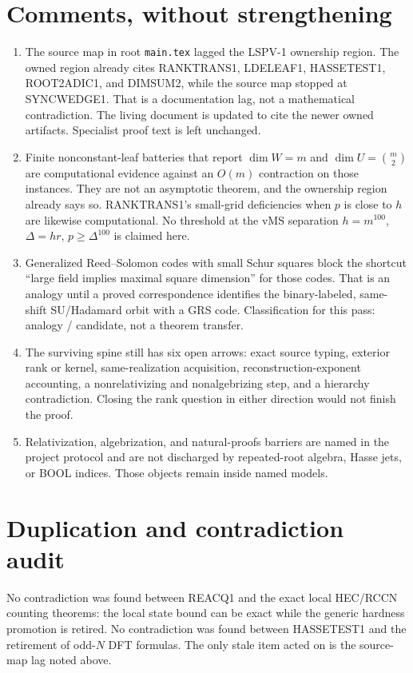 \documentclass[11pt]{article}
\begin{document}
\section*{Comments, without strengthening}
\begin{enumerate}
\item The source map in root \texttt{main.tex} lagged the LSPV-1 ownership region.
The owned region already cites RANKTRANS1, LDELEAF1, HASSETEST1, ROOT2ADIC1, and
DIMSUM2, while the source map stopped at SYNCWEDGE1. That is a documentation lag,
not a mathematical contradiction. The living document is updated to cite the newer
owned artifacts. Specialist proof text is left unchanged.
\item Finite nonconstant-leaf batteries that report
\(\dim W=m\) and \(\dim U=\binom{m}{2}\) are computational evidence against an
\(O(m)\) contraction on those instances. They are not an asymptotic theorem, and
the ownership region already says so. RANKTRANS1's small-grid deficiencies when
\(p\) is close to \(h\) are likewise computational. No threshold at the vMS
separation \(h=m^{100}\), \(\Delta=hr\), \(p\ge\Delta^{100}\) is claimed here.
\item Generalized Reed--Solomon codes with small Schur squares block the shortcut
``large field implies maximal square dimension'' for those codes. That is an
analogy until a proved correspondence identifies the binary-labeled, same-shift
SU/Hadamard orbit with a GRS code. Classification for this pass: analogy /
candidate, not a theorem transfer.
\item The surviving spine still has six open arrows: exact source typing, exterior
rank or kernel, same-realization acquisition, reconstruction-exponent accounting,
a nonrelativizing and nonalgebrizing step, and a hierarchy contradiction.
Closing the rank question in either direction would not finish the proof.
\item Relativization, algebrization, and natural-proofs barriers are named in the
project protocol and are not discharged by repeated-root algebra, Hasse jets, or
BOOL indices. Those objects remain inside named models.
\end{enumerate}

\section*{Duplication and contradiction audit}
No contradiction was found between REACQ1 and the exact local HEC/RCCN counting
theorems: the local state bound can be exact while the generic hardness promotion
is retired. No contradiction was found between HASSETEST1 and the retirement of
odd-\(N\) DFT formulas. The only stale item acted on is the source-map lag noted
above.
\end{document}
